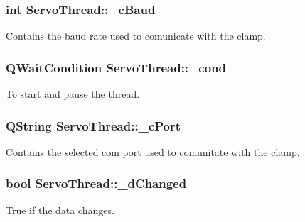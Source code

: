\subsubsection[{\+\_\+c\+Baud}]{\setlength{\rightskip}{0pt plus 5cm}int Servo\+Thread\+::\+\_\+c\+Baud\hspace{0.3cm}{\ttfamily [private]}}\label{a00007_a9fccfd415e2e55c8abef7fcc6535af30}


Contains the baud rate used to comunicate with the clamp. 

\hypertarget{a00007_afcb93c09acd7fecf47d92996a297365c}{}
\subsubsection[{\+\_\+cond}]{\setlength{\rightskip}{0pt plus 5cm}Q\+Wait\+Condition Servo\+Thread\+::\+\_\+cond\hspace{0.3cm}{\ttfamily [private]}}\label{a00007_afcb93c09acd7fecf47d92996a297365c}


To start and pause the thread. 

\hypertarget{a00007_ab52437b31a433c427a6c050f2b1cc959}{}
\subsubsection[{\+\_\+c\+Port}]{\setlength{\rightskip}{0pt plus 5cm}Q\+String Servo\+Thread\+::\+\_\+c\+Port\hspace{0.3cm}{\ttfamily [private]}}\label{a00007_ab52437b31a433c427a6c050f2b1cc959}


Contains the selected com port used to comunitate with the clamp. 

\hypertarget{a00007_a2b6ccfeacbb3cc9ac5c34549b9aa3f11}{}
\subsubsection[{\+\_\+d\+Changed}]{\setlength{\rightskip}{0pt plus 5cm}bool Servo\+Thread\+::\+\_\+d\+Changed\hspace{0.3cm}{\ttfamily [private]}}\label{a00007_a2b6ccfeacbb3cc9ac5c34549b9aa3f11}


True if the data changes. 

